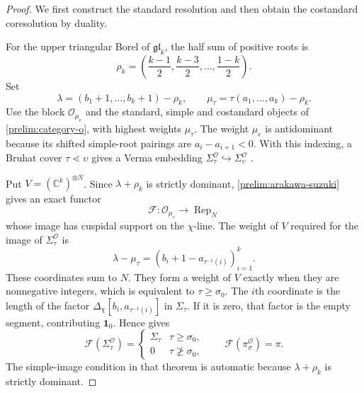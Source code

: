 \documentclass[10pt,a4paper]{article}
\theoremstyle{definition}
\theoremstyle{remark}
\numberwithin{equation}{section}
\newcommand{\CC}{\mathbb{C}}
\newcommand{\rep}{\operatorname{Rep}}
\newcommand{\one}{\mathbf{1}}
\newcommand{\hra}{\hookrightarrow}
\newcommand{\De}{\Delta}
\begin{document}
\begin{proof}
We first construct the standard resolution and then obtain the
costandard coresolution by duality.

For the upper triangular Borel of $\mathfrak{gl}_k$, the half sum of
positive roots is
\[
 \rho_k=\left(\frac{k-1}{2},\frac{k-3}{2},\ldots,\frac{1-k}{2}\right).
\]
Set
\[
 \lambda=(b_1+1,\ldots,b_k+1)-\rho_k,\qquad
 \mu_\tau=\tau(a_1,\ldots,a_k)-\rho_k.
\]
Use the block $\mathcal O_{\mu_e}$ and the standard, simple and
costandard objects of \cref{prelim:category-o}, with highest weights
$\mu_\tau$.
The weight $\mu_e$ is antidominant because its shifted simple-root
pairings are $a_i-a_{i+1}<0$. With this indexing, a Bruhat cover
$\tau\lessdot\upsilon$ gives a Verma embedding
$\Sigma_\tau^{\mathcal O}\hra \Sigma_\upsilon^{\mathcal O}$
\cite[\S1, equation~(1.2)]{RegularDhillon2019}.

Put $V=(\CC^k)^{\otimes N}$. Since $\lambda+\rho_k$ is strictly
dominant, \cref{prelim:arakawa-suzuki} gives an exact functor
\[
 \mathcal F:\mathcal O_{\mu_e}\longrightarrow\rep_N
\]
whose image has cuspidal support on the $\chi$-line.
The weight of $V$ required for the image of $\Sigma_\tau^{\mathcal O}$ is
\[
 \lambda-\mu_\tau
   =(b_i+1-a_{\tau^{-1}(i)})_{i=1}^k.
\]
These coordinates sum to $N$. They form a weight of $V$ exactly
when they are nonnegative integers, which is equivalent to
$\tau\geq\sigma_0$. The $i$th coordinate is the length of the factor
$\De_\chi[b_i,a_{\tau^{-1}(i)}]$ in $\Sigma_\tau$.
If it is zero, that factor is the empty segment, contributing
$\one_0$. Hence \cite[Theorem~4.2.3]{BC2015} gives
\[
 \mathcal F(\Sigma_\tau^{\mathcal O})=
 \begin{cases}
  \Sigma_\tau&\tau\geq\sigma_0,\\
  0&\tau\not\geq\sigma_0,
 \end{cases}
 \qquad
 \mathcal F(\pi_\sigma^{\mathcal O})=\pi.
\]
The simple-image condition in that theorem is automatic because
$\lambda+\rho_k$ is strictly dominant.


\end{proof}
\end{document}
